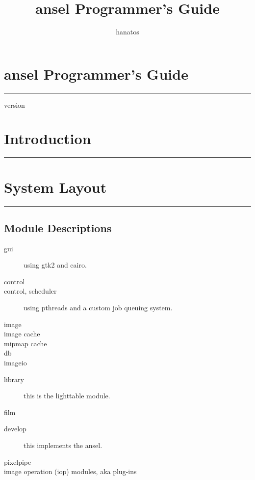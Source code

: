 \documentclass[a4paper,twoside]{scrartcl}
\title{ansel Programmer's Guide}
\author{hanatos}
\newcommand{\nicesection}[2]{%
\cleardoublepage
\fbox{\texttt{[image: \#1]}}%
\vspace*{-1em}%
\section{\hfill #2}
\hrule
\vspace*{\baselineskip}%
}
\begin{document}
%
\vspace*{-1em}%
\section*{\hfill ansel Programmer's Guide}
\hrule

\vspace*{4\baselineskip}

{\hfill version  }

\thispagestyle{empty}

\newpage
\tableofcontents


\nicesection{header1}{Introduction}
\label{sec:introduction}


\nicesection{header2}{System Layout}

\resizebox{\linewidth}{!}{}

\subsection{Module Descriptions}

\begin{description}
  \item[gui] using gtk2 and cairo.
\end{description}
\begin{description}
  \item[control]
  \item[control, scheduler] using pthreads and a custom job queuing system.
\end{description}
\begin{description}
  \item[image]
  \item[image cache]
  \item[mipmap cache]
  \item[db]
  \item[imageio]
\end{description}
\begin{description}
  \item[library] this is the lighttable module.
  \item[film]
\end{description}
\begin{description}
  \item[develop] this implements the ansel.
  \item[pixelpipe]
  \item[image operation (iop) modules, aka plug-ins]
\end{description}
\end{document}
